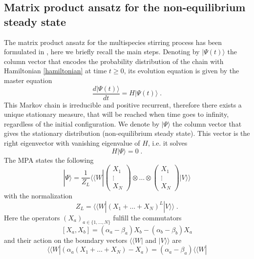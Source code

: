 \documentclass[10pt]{article}
\numberwithin{equation}{section}
\numberwithin{equation}{subsection}
\newcommand{\dt}{\;.}
\newcommand{\fra}[1]{\textcolor[rgb]{0,0,1}{#1}}
\begin{document}
\subsection{Matrix product ansatz for the non-equilibrium steady state}
The matrix product ansatz for the multispecies stirring process has been formulated in \cite{vanicat2017exact}, here we briefly recall the main steps.
 Denoting by $|\Psi(t)\rangle$ the column vector that encodes the probability distribution of the chain with Hamiltonian \eqref{hamiltonian} at time $t\geq 0$, its evolution equation is given by 
 the master equation
\begin{equation}
    \frac{d|{\Psi}(t)\rangle}{dt}=H|{\Psi}(t)\rangle\dt
\end{equation}
This Markov chain is irreducible and positive recurrent, therefore there exists a unique stationary measure, that will be reached when time goes to infinity, regardless of the initial configuration. 
We denote by $|\Psi\rangle$ the column vector that gives the stationary distribution (non-equilibrium steady state). This vector is the right eigenvector with vanishing eigenvalue of $H$, i.e. it solves 
\begin{equation}\label{definition-SteadyStateH}
	H|\Psi\rangle =0\dt
\end{equation}
The MPA states the following
\begin{equation}
	|\Psi\rangle=\frac{1}{Z_{L}} \langle \langle W|  \begin{pmatrix}
		X_{1}\\
		\vdots\\
		X_{N}
	\end{pmatrix}\otimes \ldots\otimes \begin{pmatrix}
		X_{1}\\
		\vdots\\
		X_{N}
	\end{pmatrix} |V\rangle\rangle 
\end{equation}
with the normalization 
\begin{equation}
	Z_{L}= \langle \langle W|  (X_{1}+\ldots +X_{N})^{L} |V\rangle\rangle \dt
\end{equation}
Here the operators $(X_{a})_{a\in \{1,\ldots,N\}}$ fulfill the commutators
\begin{equation}\label{bulk}
	\left[X_{a},X_{b}\right]=(\alpha_{a}-\beta_{a})X_{b}-(\alpha_{b}-\beta_{b})X_{a}
\end{equation}
and their action on the boundary vectors  \fra{$\langle \langle W|$ and $|V\rangle \rangle$} are
\begin{equation}\label{leftBoundary}
	 \langle \langle W|  \left(\alpha_{a}(X_{1}+\ldots+X_{N})-X_{a}\right)=(\alpha_{a}-\beta_{a}) \langle \langle W|  
\end{equation}
\end{document}
